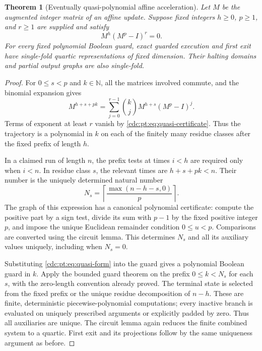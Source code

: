 \documentclass[11pt,a4paper]{article}
\newtheorem{theorem}{Theorem}[section]
\theoremstyle{definition}
\theoremstyle{remark}
\newcommand{\N}{\mathbb N}
\begin{document}
\begin{theorem}[Eventually quasi-polynomial affine acceleration]
\label{cdc:pt:thm:quasi}
Let $M$ be the augmented integer matrix of an affine update. Suppose fixed
integers $h\geq0$, $p\geq1$, and $r\geq1$ are supplied and satisfy
\begin{equation}
 M^h(M^p-I)^r=0.
 \label{cdc:pt:eq:quasi-certificate}
\end{equation}
For every fixed polynomial Boolean guard, exact guarded execution and
first exit have single-fold quartic representations of fixed dimension.
Their halting domains and partial output graphs are also single-fold.
\end{theorem}
\begin{proof}
For $0\leq s<p$ and $k\in\N$, all the matrices involved commute,
and the binomial expansion gives
\begin{equation}
 M^{h+s+pk}
 =\sum_{j=0}^{r-1}\binom kj M^{h+s}(M^p-I)^j.
 \label{cdc:pt:eq:quasi-form}
\end{equation}
Terms of exponent at least $r$ vanish by
\eqref{cdc:pt:eq:quasi-certificate}. Thus the trajectory is a polynomial in $k$
on each of the finitely many residue classes after the fixed prefix of
length $h$.

In a claimed run of length $n$, the prefix tests at times $i<h$ are
required only when $i<n$. In residue class $s$, the relevant times are
$h+s+pk<n$. Their number is the uniquely determined natural number
\[
 N_s=\left\lceil\frac{\max(n-h-s,0)}p\right\rceil.
\]
The graph of this expression has a canonical polynomial certificate:
compute the positive part by a sign test, divide its sum with $p-1$ by
the fixed positive integer $p$, and impose the unique Euclidean remainder
condition $0\leq u<p$. Comparisons are converted using the circuit lemma.
This determines $N_s$ and all its auxiliary values uniquely, including
when $N_s=0$.

Substituting \eqref{cdc:pt:eq:quasi-form} into the guard gives a polynomial
Boolean guard in $k$. Apply the bounded guard theorem on the prefix
$0\leq k<N_s$ for each $s$, with the zero-length convention already
proved. The terminal state is selected from the fixed prefix or the
unique residue decomposition of $n-h$. These are finite, deterministic
piecewise-polynomial computations; every inactive branch is evaluated on
uniquely prescribed arguments or explicitly padded by zero. Thus all
auxiliaries are unique. The circuit lemma again reduces the finite
combined system to a quartic. First exit and its projections follow by the
same uniqueness argument as before.
\end{proof}
\end{document}
